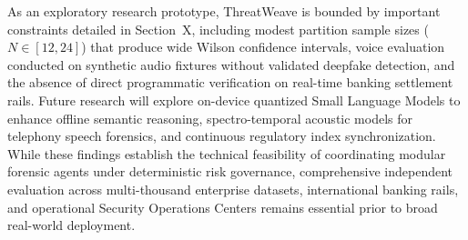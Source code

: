 \documentclass[conference]{IEEEtran}
\begin{document}
As an exploratory research prototype, ThreatWeave is bounded by important constraints detailed in Section~X, including modest partition sample sizes ($N \in [12, 24]$) that produce wide Wilson confidence intervals, voice evaluation conducted on synthetic audio fixtures without validated deepfake detection, and the absence of direct programmatic verification on real-time banking settlement rails. Future research will explore on-device quantized Small Language Models to enhance offline semantic reasoning, spectro-temporal acoustic models for telephony speech forensics, and continuous regulatory index synchronization. While these findings establish the technical feasibility of coordinating modular forensic agents under deterministic risk governance, comprehensive independent evaluation across multi-thousand enterprise datasets, international banking rails, and operational Security Operations Centers remains essential prior to broad real-world deployment.

\end{document}
